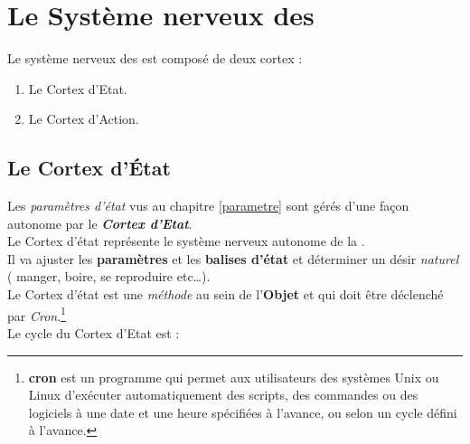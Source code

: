 \documentclass[french]{report}
\newlength{\du}\fi
\begin{document}
\newpage
\section{Le Système nerveux des \CoCiX}\label{nerveux}

Le système nerveux des \CoCiX est composé de deux cortex :
\begin{enumerate}
	\item Le Cortex d'Etat.
	\item Le Cortex d'Action. \\
\end{enumerate}

\subsection{Le Cortex d'État}\label{cortex_etat}

Les \textit{paramètres d'état} vus au chapitre \ref{parametre} sont gérés d'une façon autonome par le \textit{\textbf{Cortex d'Etat}}.\\
Le Cortex d'état représente  le système nerveux autonome de la \CoCiX.\\
Il va ajuster les \textbf{paramètres} et les \textbf{balises d'état} et déterminer un désir \textit{naturel} ( manger, boire, se reproduire etc\dots).\\
Le Cortex d'état est une \textit{méthode} au sein de l'\textbf{Objet} \CoCiX et qui doit être déclenché par \textit{Cron}.\footnote{\textbf{cron} est un programme qui permet aux utilisateurs des systèmes Unix  ou Linux d'exécuter automatiquement des scripts, des commandes ou des logiciels à une date et une heure spécifiées à l'avance, ou selon un cycle défini à l'avance.}\\
Le cycle du Cortex d'Etat est :\\
\end{document}
